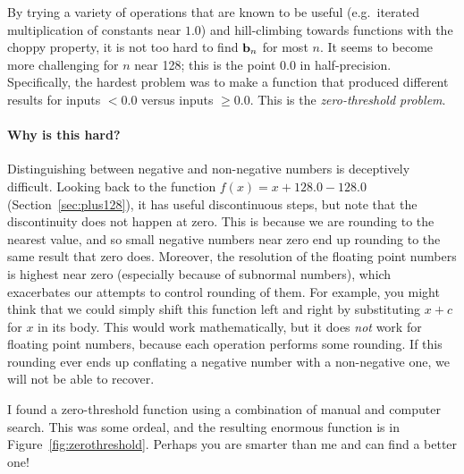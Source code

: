 \documentclass[twocolumn]{article}
\newcommand\basis{\ensuremath{\textrm{\bf b}}}
\begin{document}
By trying a variety of operations that are known to be useful
(e.g.~iterated multiplication of constants near $1.0$) and
hill-climbing towards functions with the choppy property, it is not
too hard to find $\basis_n$ for most $n$. It seems to become more
challenging for $n$ near 128; this is the point $0.0$ in
half-precision. Specifically, the hardest problem was to make a
function that produced different results for inputs $< 0.0$ versus
inputs $\geq 0.0$. This is the {\em zero-threshold problem}.

\paragraph{Why is this hard?}
Distinguishing between negative and non-negative numbers is
deceptively difficult. Looking back to the function $f(x) = x + 128.0
- 128.0$ (Section~\ref{sec:plus128}), it has useful discontinuous
steps, but note that the discontinuity does not happen at zero. This
is because we are rounding to the nearest value, and so small negative
numbers near zero end up rounding to the same result that zero does.
Moreover, the resolution of the floating point numbers is highest near
zero (especially because of subnormal numbers), which exacerbates our
attempts to control rounding of them. For example, you might think
that we could simply shift this function left and right by
substituting $x + c$ for $x$ in its body. This would work
mathematically, but it does {\em not} work for floating point numbers,
because each operation performs some rounding. If this rounding ever
ends up conflating a negative number with a non-negative one, we will
not be able to recover.

I found a zero-threshold function using a combination of manual and
computer search. This was some ordeal, and the resulting enormous
function is in Figure~\ref{fig:zerothreshold}. Perhaps you are
smarter than me and can find a better one!
\end{document}
